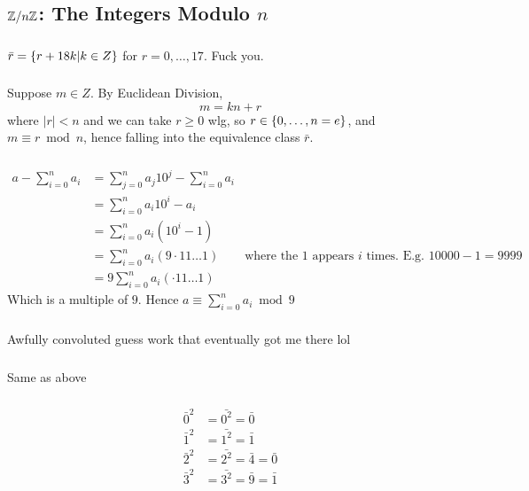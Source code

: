 \documentclass{article}
\begin{document}
\subsection{$\mathbb{Z}/n\mathbb{Z}$: The Integers Modulo $n$}
\subsubsection{}
$\bar{r} = \{ r+18k | k \in Z \}$ for $r=0,\ldots,17$. Fuck you.
\subsubsection{}
Suppose $m \in Z$. By Euclidean Division, 
\begin{equation*}
m = kn + r
\end{equation*}
where $|r| < n$ and we can take $r \geq 0$ wlg, so $r \in \{ 0,\ldots,n=e \}$, and $m \equiv r \bmod{n}$, hence falling into the equivalence class $\bar{r}$.
\subsubsection{}
\begin{align*}
a - \sum_{i=0}^na_i &=
\sum_{j=0}^na_j10^j -  \sum_{i=0}^n{a_i}\\
&= \sum_{i=0}^na_i10^i -{a_i}\\
&= \sum_{i=0}^na_i(10^i - 1)\\
&= \sum_{i=0}^na_i(9\cdot 11\ldots 1) & \text{where the $1$ appears $i$ times. E.g. $10000 - 1 = 9999$}\\
&= 9\sum_{i=0}^na_i(\cdot 11\ldots 1)
\end{align*}
Which is a multiple of $9$. Hence $a \equiv \sum_{i=0}^n{a_i} \bmod{9}$
\subsubsection{}
Awfully convoluted guess work that eventually got me there lol
\subsubsection{}
Same as above
\subsubsection{}
\begin{align*}
\bar{0}^2 &= \bar{0^2} = \bar{0}\\
\bar{1}^2 &= \bar{1^2} = \bar{1}\\
\bar{2}^2 &= \bar{2^2} = \bar{4} = \bar{0}\\
\bar{3}^2 &= \bar{3^2} = \bar{9} = \bar{1}\\
\end{align*}
~\\\\\\
\end{document}

